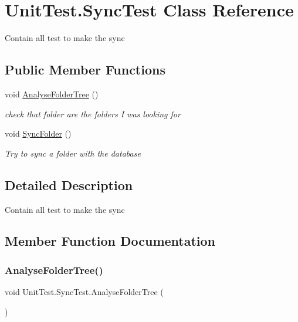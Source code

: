 \hypertarget{class_unit_test_1_1_sync_test}{}\section{Unit\+Test.\+Sync\+Test Class Reference}
\label{class_unit_test_1_1_sync_test}


Contain all test to make the sync  


\subsection*{Public Member Functions}
\begin{DoxyCompactItemize}
\item 
void \hyperlink{class_unit_test_1_1_sync_test_a0a50b296418fd090f3d1fa085a328ab8}{Analyse\+Folder\+Tree} ()
\begin{DoxyCompactList}\small\item\em check that folder are the folders I was looking for \end{DoxyCompactList}\item 
void \hyperlink{class_unit_test_1_1_sync_test_a988e686b462be304ca52e67b9f1876a3}{Sync\+Folder} ()
\begin{DoxyCompactList}\small\item\em Try to sync a folder with the database \end{DoxyCompactList}\end{DoxyCompactItemize}


\subsection{Detailed Description}
Contain all test to make the sync 



\subsection{Member Function Documentation}
\mbox{\label{class_unit_test_1_1_sync_test_a0a50b296418fd090f3d1fa085a328ab8}} 
\subsubsection{\texorpdfstring{Analyse\+Folder\+Tree()}{AnalyseFolderTree()}}
{\footnotesize\ttfamily void Unit\+Test.\+Sync\+Test.\+Analyse\+Folder\+Tree (\begin{DoxyParamCaption}{ }\end{DoxyParamCaption})}



